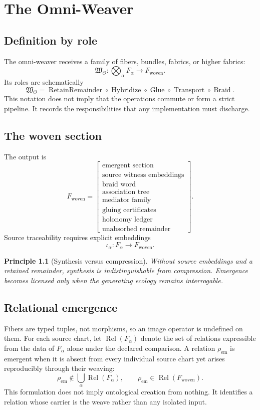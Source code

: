 \documentclass[12pt,openany]{book}
\newtheorem{principle}[definition]{Principle}
\theoremstyle{remark}
\DeclareMathOperator{\Rel}{Rel}
\newcommand{\WTheta}{\mathfrak W_{\Theta}}
\begin{document}
\chapter{The Omni-Weaver}
\label{ch:omni-weaver}

\section{Definition by role}
The omni-weaver receives a family of fibers, bundles, fabrics, or higher fabrics:
\[
\WTheta:
\bigotimes_{\alpha}F_\alpha
\longrightarrow
F_{\mathrm{woven}}.
\]
Its roles are schematically
\[
\WTheta
=
\operatorname{RetainRemainder}
\circ
\operatorname{Hybridize}
\circ
\operatorname{Glue}
\circ
\operatorname{Transport}
\circ
\operatorname{Braid}.
\]
This notation does not imply that the operations commute or form a strict pipeline. It records the responsibilities that any implementation must discharge.

\section{The woven section}
The output is
\[
F_{\mathrm{woven}}
=
\begin{bmatrix}
\text{emergent section}\\
\text{source witness embeddings}\\
\text{braid word}\\
\text{association tree}\\
\text{mediator family}\\
\text{gluing certificates}\\
\text{holonomy ledger}\\
\text{unabsorbed remainder}
\end{bmatrix}.
\]
Source traceability requires explicit embeddings
\[
\iota_\alpha:F_\alpha\longrightarrow F_{\mathrm{woven}}.
\]

\begin{principle}[Synthesis versus compression]
Without source embeddings and a retained remainder, synthesis is indistinguishable from compression. Emergence becomes licensed only when the generating ecology remains interrogable.
\end{principle}

\section{Relational emergence}
Fibers are typed tuples, not morphisms, so an image operator is undefined on them. For each source chart, let $\Rel(F_\alpha)$ denote the set of relations expressible from the data of $F_\alpha$ alone under the declared comparison. A relation $\rho_{\mathrm{em}}$ is emergent when it is absent from every individual source chart yet arises reproducibly through their weaving:
\[
\rho_{\mathrm{em}}
\notin
\bigcup_\alpha\Rel(F_\alpha),
\qquad
\rho_{\mathrm{em}}
\in
\Rel(F_{\mathrm{woven}}).
\]
This formulation does not imply ontological creation from nothing. It identifies a relation whose carrier is the weave rather than any isolated input.
\end{document}
